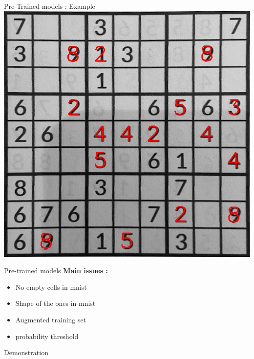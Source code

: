 \documentclass[12pt, dvipsnames]{beamer}
\begin{document}
\begin{frame}{Pre-Trained models : Example}
    \centering
    \includegraphics[scale = 0.4]{resources/png/ResnetOverlay.jpg}
\end{frame}

\begin{frame}{Pre-trained models}
    \textbf{Main issues :}
    \begin{itemize}
        \item No empty cells in mnist
        \item Shape of the ones in mnist
        \item Augmented training set
        \item probability threshold
    \end{itemize}
\end{frame}


\begin{frame}[standout]
    Demonstration
\end{frame}
\end{document}
